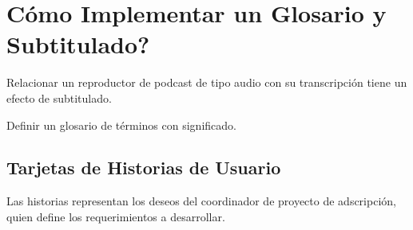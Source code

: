 \section{\textquestiondown Cómo Implementar un Glosario y Subtitulado?}

Relacionar un reproductor de podcast de tipo audio con su transcripción
tiene un efecto de subtitulado. 

Definir un glosario de términos con significado.
 
\subsection{Tarjetas de Historias de Usuario}

Las historias representan los deseos del coordinador de proyecto de
adscripción, quien define los requerimientos a desarrollar.

